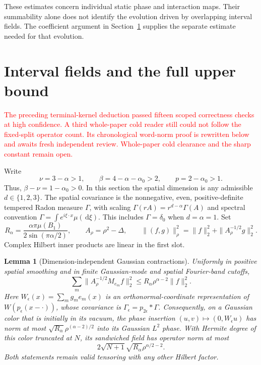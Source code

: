 \documentclass[12pt]{article}
\numberwithin{equation}{section}
\newtheorem{lemma}[theorem]{Lemma}
\theoremstyle{definition}
\newcommand{\ud}{\,\mathrm{d}}
\newcommand{\myCmts}[1]{\begin{framed}\noindent\textcolor{red}{#1}\end{framed}}
\begin{document}
These estimates concern individual static phase and interaction maps.
Their summability alone does not identify the evolution driven by
overlapping interval fields. The coefficient argument in
Section~\ref{S:interval-upper} supplies the separate estimate needed
for that evolution.

\section{Interval fields and the full upper bound}
\label{S:interval-upper}

\myCmts{The preceding terminal-kernel deduction passed fifteen scoped
correctness checks at high confidence. A third whole-paper cold reader
still could not follow the fixed-split operator count. Its chronological
word-norm proof is rewritten below and awaits fresh independent review.
Whole-paper cold clearance and the sharp constant remain open.}

Write
\[
  \nu=3-\alpha>1,\qquad
  \beta=4-\alpha-\alpha_0>2,\qquad p=2-\alpha_0>1.
\]
Thus, $\beta-\nu=1-\alpha_0>0$.
In this section the spatial dimension is any admissible $d\in\{1,2,3\}$.
The spatial covariance is the nonnegative, even, positive-definite tempered
Radon measure $\Gamma$, with scaling
$\Gamma(rA)=r^{d-\alpha}\Gamma(A)$ and spectral convention
$\Gamma=\int e^{i\xi\cdot x}\mu(\ud\xi)$.
This includes $\Gamma=\delta_0$ when $d=\alpha=1$.
Set
\[
  R_\alpha=\frac{\alpha\pi\mu(B_1)}{2\sin(\pi\alpha/2)},\qquad
  A_\rho=\rho^2-\Delta,\qquad
  \|(f,g)\|_\rho^2=\|f\|_2^2+\|A_\rho^{-1/2}g\|_2^2.
\]
Complex Hilbert inner products are linear in the first slot.

\begin{lemma}[Dimension-independent Gaussian contractions]
  \label{L:interval-contractions}
  Uniformly in positive spatial smoothing and in finite Gaussian-mode
  and spatial Fourier-band cutoffs,
  \begin{equation}\label{E:interval-column}
    \sum_m\|A_\rho^{-1/2}M_{e_m}f\|_2^2
    \le R_\alpha\rho^{\alpha-2}\|f\|_2^2.
  \end{equation}
  Here $W_\epsilon(x)=\sum_m g_me_m(x)$ is an orthonormal-coordinate
  representation of $W(p_\epsilon(x-\cdot))$, whose covariance is
  $\Gamma_\epsilon=p_{2\epsilon}*\Gamma$.
  Consequently, on a Gaussian color that is initially in its vacuum,
  the phase insertion $(u,v)\mapsto(0,W_\epsilon u)$ has norm at most
  $\sqrt{R_\alpha}\rho^{(\alpha-2)/2}$ into its Gaussian $L^2$ phase.
  With Hermite degree of this color truncated at $N$, its sandwiched
  field has operator norm at most
  \begin{equation}\label{E:interval-fock}
    2\sqrt{N+1}\sqrt{R_\alpha}\rho^{\alpha/2-2}.
  \end{equation}
  Both statements remain valid tensoring with any other Hilbert factor.
\end{lemma}
\end{document}
